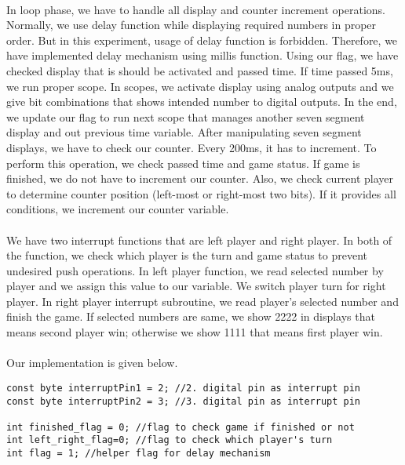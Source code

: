 \documentclass[pdftex,12pt,a4paper]{article}
\begin{document}
\begin{flushleft}
\paragraph{}
In loop phase, we have to handle all display and counter increment operations. Normally, we use delay function while displaying required numbers in proper order. But in this experiment, usage of delay function is forbidden. Therefore, we have implemented delay mechanism using millis function. Using our flag, we have checked display that is should be activated and passed time. If time passed 5ms, we run proper scope. In scopes, we activate display using analog outputs and we give bit combinations that shows intended number to digital outputs. In the end, we update our flag to run next scope that manages another seven segment display and out previous time variable. After manipulating seven segment displays, we have to check our counter. Every 200ms, it has to increment. To perform this operation, we check passed time and game status. If game is finished, we do not have to increment our counter. Also, we check current player to determine counter position (left-most or right-most two bits). If it provides all conditions, we increment our counter variable.
\paragraph{}
We have two interrupt functions that are left player and right player. In both of the function, we check which player is the turn and game status to prevent undesired push operations. In left player function, we read selected number by player and we assign this value to our variable. We switch player turn for right player. In right player interrupt subroutine, we read player's selected number and finish the game. If selected numbers are same, we show 2222 in displays that means second player win; otherwise we show 1111 that means first player win.
\paragraph{}
Our implementation is given below.

\begin{lstlisting}[language=Arduino]
const byte interruptPin1 = 2; //2. digital pin as interrupt pin
const byte interruptPin2 = 3; //3. digital pin as interrupt pin

int finished_flag = 0; //flag to check game if finished or not
int left_right_flag=0; //flag to check which player's turn
int flag = 1; //helper flag for delay mechanism


\end{lstlisting}
\end{flushleft}
\end{document}
